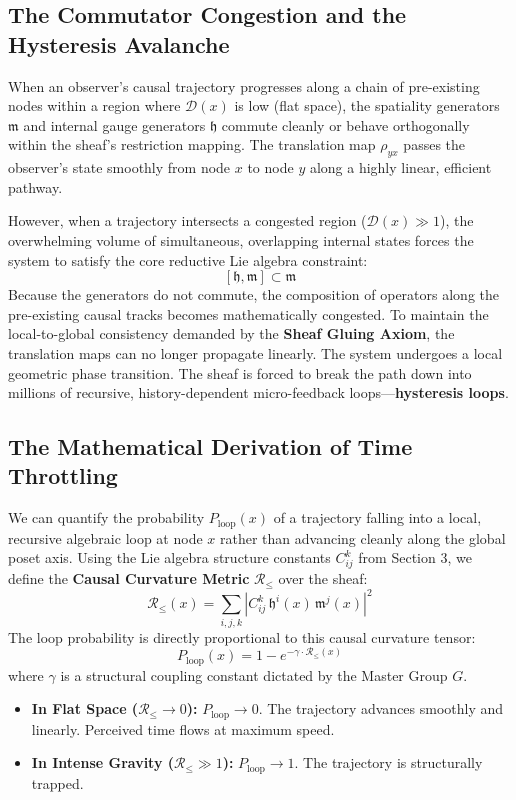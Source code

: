 \documentclass[12pt,letterpaper]{article}
\begin{document}
\subsection{The Commutator Congestion and the Hysteresis Avalanche}
When an observer's causal trajectory progresses along a chain of pre-existing nodes within a region where $\mathcal{D}(x)$ is low (flat space), the spatiality generators $\mathfrak{m}$ and internal gauge generators $\mathfrak{h}$ commute cleanly or behave orthogonally within the sheaf's restriction mapping. The translation map $\rho_{yx}$ passes the observer's state smoothly from node $x$ to node $y$ along a highly linear, efficient pathway.

However, when a trajectory intersects a congested region ($\mathcal{D}(x) \gg 1$), the overwhelming volume of simultaneous, overlapping internal states forces the system to satisfy the core reductive Lie algebra constraint:
$$[\mathfrak{h}, \mathfrak{m}] \subset \mathfrak{m}$$
Because the generators do not commute, the composition of operators along the pre-existing causal tracks becomes mathematically congested. To maintain the local-to-global consistency demanded by the \textbf{Sheaf Gluing Axiom}, the translation maps can no longer propagate linearly. The system undergoes a local geometric phase transition. The sheaf is forced to break the path down into millions of recursive, history-dependent micro-feedback loops---\textbf{hysteresis loops}.

\subsection{The Mathematical Derivation of Time Throttling}
We can quantify the probability $P_{\text{loop}}(x)$ of a trajectory falling into a local, recursive algebraic loop at node $x$ rather than advancing cleanly along the global poset axis. Using the Lie algebra structure constants $C_{ij}^k$ from Section 3, we define the \textbf{Causal Curvature Metric} $\mathcal{R}_{\le}$ over the sheaf:
$$\mathcal{R}_{\le}(x) = \sum_{i,j,k} \left| C_{ij}^k \, \mathfrak{h}^i(x) \, \mathfrak{m}^j(x) \right|^2$$
The loop probability is directly proportional to this causal curvature tensor:
$$P_{\text{loop}}(x) = 1 - e^{-\gamma \cdot \mathcal{R}_{\le}(x)}$$
where $\gamma$ is a structural coupling constant dictated by the Master Group $G$.
\begin{itemize}
    \item \textbf{In Flat Space ($\mathcal{R}_{\le} \to 0$):} $P_{\text{loop}} \to 0$. The trajectory advances smoothly and linearly. Perceived time flows at maximum speed.
    \item \textbf{In Intense Gravity ($\mathcal{R}_{\le} \gg 1$):} $P_{\text{loop}} \to 1$. The trajectory is structurally trapped.
\end{itemize}
\end{document}
